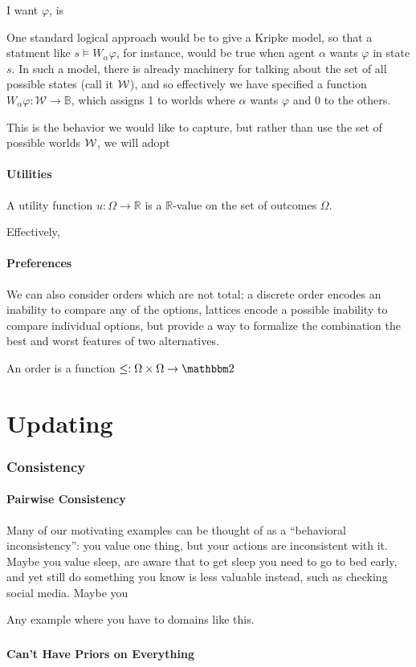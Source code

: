 \documentclass{article}
\begin{document}
	I want $\varphi$, is 
	
	One standard logical approach would be to give a Kripke model, so that a statment like $s \vDash W_{\alpha} \varphi$, for instance, would be true when agent $\alpha$ wants $\varphi$ in state $s$. In such a model, there is already machinery for talking about the set of all possible states (call it $\cal W$), and so effectively we have specified a function $W_\alpha \varphi: \mathcal W \to \mathbb B$, which assigns 1 to worlds where $\alpha$ wants $\varphi$ and 0 to the others.
	
	This is the behavior we would like to capture, but rather than use the set of possible worlds $\cal W$, we will adopt 
	
	
	\subsection{Utilities}
	
		
	
	A utility function $u : \Omega \to \mathbb R$ is a $\mathbb R$-value on the set of outcomes $\Omega$. 
	
	Effectively, 

	
	\subsection{Preferences}
	We can also consider orders which are not total; a discrete order encodes an inability to compare any of the options, lattices encode a possible inability to compare individual options, but provide a way to formalize the combination the best and worst features of two alternatives.
	
	
	An order is a function $\leq: \Omega \times \Omega \to \mathbbm 2$
	
	\part{Updating}
	
	\section{Consistency}
	\subsection{Pairwise Consistency}
	Many of our motivating examples can be thought of as a ``behavioral inconsistency'': you value one thing, but your actions are inconsistent with it. Maybe you value sleep, are aware that to get sleep you need to go to bed early, and yet still do something you know is less valuable instead, such as checking social media. Maybe you 

	Any example where you have to domains like this.
	
	\appendix
	\section{} %
	
	\subsection{Can't Have Priors on Everything}\label{sec:impossible-prior}
	
	
		
	
	
\end{document}
